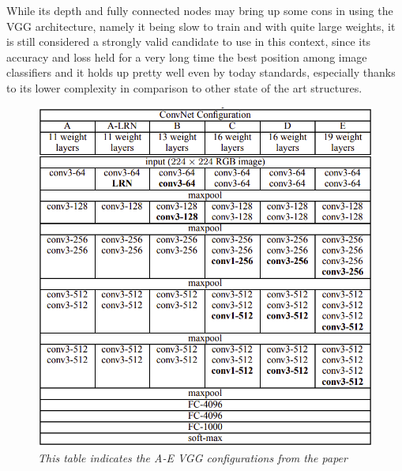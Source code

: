 \documentclass[12pt,a4paper]{report}
\begin{document}
While its depth and fully connected nodes may bring up some cons in using the VGG architecture, namely it being slow to train and with quite large weights, it is still considered a strongly valid candidate to use in this context, since its accuracy and loss held for a very long time the best position among image classifiers and it holds up pretty well even by today standards, especially thanks to its lower complexity in comparison to other state of the art structures.
\begin{figure}[H]
\centering
\includegraphics[scale=0.4]{./immagini/vgg_layers_table.png}
\caption{\textit{This table indicates the A-E VGG configurations from the paper \cite{VGG_configurations_table}}}
\label{fig:vgg_layers_table}
\end{figure}
\end{document}
